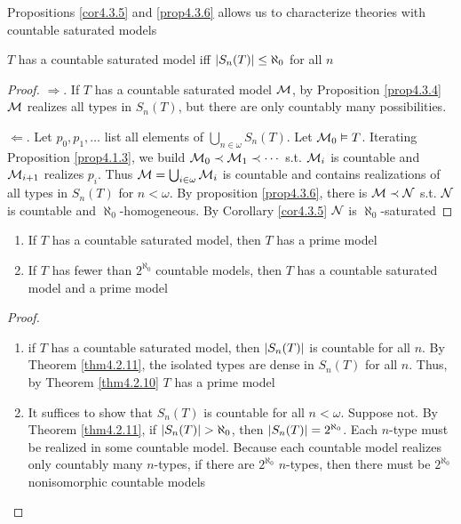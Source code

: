 \documentclass[11pt]{article}
\begin{document}
Propositions \ref{cor4.3.5} and \ref{prop4.3.6} allows us to characterize theories with countable
saturated models

\begin{theorem}[]
\(T\) has a countable saturated model iff \(\abs{S_n(T)}\le\aleph_0\) for all \(n\)
\end{theorem}

\begin{proof}
\(\Rightarrow\). If \(T\) has a countable saturated model \(\mathcal{M}\), by Proposition \ref{prop4.3.4} \(\mathcal{M}\)
realizes all types in \(S_n(T)\), but there are only countably many possibilities.

\(\Leftarrow\). Let \(p_0,p_1,\dots\) list all elements of \(\bigcup_{n\in\omega}S_n(T)\). Let \(\mathcal{M}_0\vDash T\). Iterating Proposition
\ref{prop4.1.3}, we build \(\mathcal{M}_0\prec\mathcal{M}_1\prec\cdots\) s.t. \(\mathcal{M}_i\) is countable and \(\mathcal{M}_{i+1}\) realizes \(p_i\).
Thus \(\mathcal{M}=\bigcup_{i\in\omega}\mathcal{M}_i\) is countable and contains realizations of all types in \(S_n(T)\)
for \(n<\omega\). By proposition \ref{prop4.3.6}, there is \(\mathcal{M}\prec\mathcal{N}\) s.t. \(\mathcal{N}\) is countable
and \(\aleph_0\)-homogeneous. By Corollary \ref{cor4.3.5} \(\mathcal{N}\) is \(\aleph_0\)-saturated
\end{proof}

\begin{corollary}[]
\label{cor4.3.8}
\begin{enumerate}
\item If \(T\) has a countable saturated model, then \(T\) has a prime model
\item If \(T\) has fewer than \(2^{\aleph_0}\) countable models, then \(T\) has a countable saturated
model and a prime model
\end{enumerate}
\end{corollary}

\begin{proof}
\begin{enumerate}
\item if \(T\) has a countable saturated model, then \(\abs{S_n(T)}\) is countable for all \(n\).
By Theorem \ref{thm4.2.11}, the isolated types are dense in \(S_n(T)\) for all \(n\). Thus, by
Theorem \ref{thm4.2.10} \(T\) has a prime model
\item It suffices to show that \(S_n(T)\) is countable for all \(n<\omega\). Suppose not. By Theorem
\ref{thm4.2.11}, if \(\abs{S_n(T)}>\aleph_0\), then \(\abs{S_n(T)}=2^{\aleph_0}\). Each \(n\)-type must
be realized in some countable model. Because each countable model realizes only countably
many \(n\)-types, if there are \(2^{\aleph_0}\) \(n\)-types, then there must be \(2^{\aleph_0}\)
nonisomorphic countable models
\end{enumerate}
\end{proof}
\end{document}
